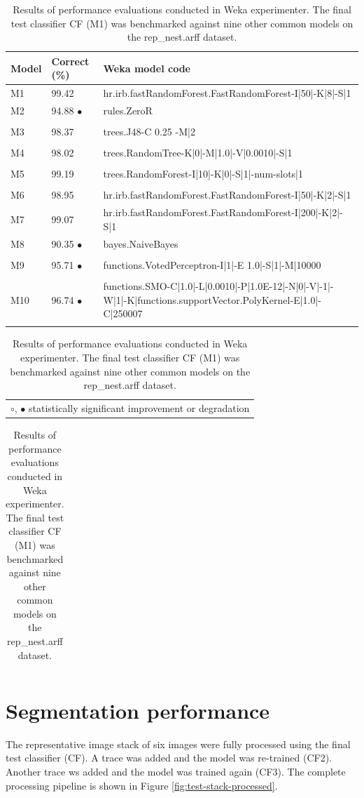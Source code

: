 \begin{table}[!htbp] \myfloatalign \caption[Classifier performance and benchmark results.]{Results of performance evaluations conducted in Weka experimenter. The final test classifier CF (M1) was benchmarked against nine other common models on the rep\_nest.arff dataset.\label{tab:benchmark}}
\begin{tabular}{llp{3.2in}} \toprule
Model & Correct (\%) & Weka model code\\ \midrule
M1 & 99.42 & hr.irb.fastRandomForest.FastRandomForest-I|50|-K|8|-S|1 \\ 
M2 & 94.88 $\bullet$ & rules.ZeroR  \\ \\
M3 & 98.37 & trees.J48-C 0.25 -M|2 \\ \\
M4 & 98.02 & trees.RandomTree-K|0|-M|1.0|-V|0.0010|-S|1 \\ \\
M5 & 99.19 & trees.RandomForest-I|10|-K|0|-S|1|-num-slots|1 \\ \\
M6 & 98.95 & hr.irb.fastRandomForest.FastRandomForest-I|50|-K|2|-S|1  \\
M7 & 99.07 & hr.irb.fastRandomForest.FastRandomForest-I|200|-K|2|-S|1 \\ 
M8 & 90.35 $\bullet$ & bayes.NaiveBayes  \\ \\
M9 & 95.71 $\bullet$ & functions.VotedPerceptron-I|1|-E 1.0|-S|1|-M|10000 \\ \\
M10 & 96.74 $\bullet$ & functions.SMO-C|1.0|-L|0.0010|-P|1.0E-12|-N|0|-V|-1|-W|1|-K|functions.supportVector.PolyKernel-E|1.0|-C|250007 \\ \\
\end{tabular} 
\begin{tabular}{c} \\
\small$\circ$, $\bullet$ statistically significant improvement or degradation\\ 
\end{tabular} 
\begin{tabular}{p{.3in}p{1in}p{3in}} 
& & \\ \bottomrule
\end{tabular} 
\end{table} 

\section{Segmentation performance}\label{sec:segmentation-performance}
The representative image stack of six images were fully processed using the final test classifier (CF). A trace was added and the model was re-trained (CF2). Another trace ws added and the model was trained again (CF3). The complete processing pipeline is shown in Figure \ref{fig:test-stack-processed}.

